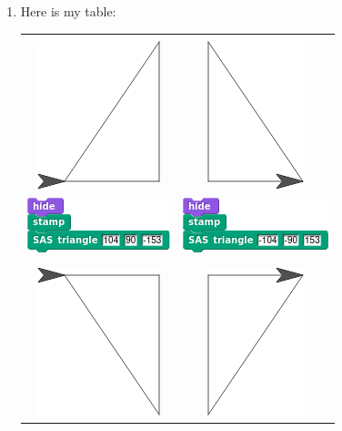 \documentclass[noauthor,nooutcomes,12pt,hints,handout]{ximera}
\begin{document}
\begin{question}
\begin{freeResponse}
\begin{enumerate}
\begin{center}
      \end{center}
    \item Here is my table:
      \begin{center}
    \begin{tabular}{|c||c|}\hline
      &  \\
      \includegraphics{stampStageII.png} & \includegraphics{stampStageI.png} \\
      \includegraphics{SASstampScriptII.png} & \includegraphics{SASstampScriptI.png} \\
      \hline\hline
      &  \\
      \includegraphics{stampStageIII.png} & \includegraphics{stampStageIV.png} \\

\end{tabular}
\end{center}
\end{enumerate}
\end{freeResponse}
\end{question}
\end{document}
